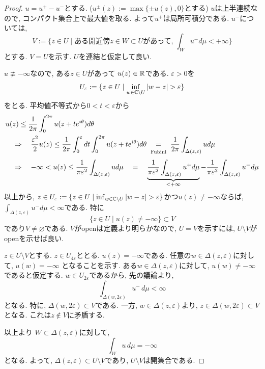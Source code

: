\begin{proof}
$u=u^{+} - u^{-}$とする. 
($u^{\pm}(z):= \max\{ \pm u(z), 0\}$とする)
$u$は上半連続なので, コンパクト集合上で最大値を取る. よって$u^{+}$は局所可積分である.
$u^{-}$については, 
$$
V:= \{ z \in U \mid \text{ある開近傍$z \in W \subset U$があって, 
$\int_{W} u^{-} d \mu < +\infty$} \}
$$
とする. $V=U$を示す. $U$を連結と仮定して良い. 

$u \not \equiv - \infty$なので, ある$z \in U$があって
$u(z) \in \mathbb{R}$である. 
$\varepsilon >0$を
$$
U_\varepsilon := \{ z \in U \mid\inf_{w \in \C \setminus U}|w - z|>\varepsilon \}
$$
をとる. 平均値不等式から$0 < t < \varepsilon$から
\begin{align*}
&u(z) \le \frac{1}{2 \pi}\int_{0}^{2\pi}u(z + t e^{i \theta}) d \theta
\\
&\underalign{\text{}}{\Rightarrow}
\frac{\varepsilon^2}{2}u(z) \le 
\frac{1}{2 \pi}\int_{0}^{\varepsilon } dt\int_{0}^{2\pi}u(z + t e^{i \theta}) d \theta
\underalign{\text{Fubini}}{=}
\frac{1}{2 \pi}\int_{\Delta(z, \varepsilon)} u d \mu
\\
&\underalign{\text{}}{\Rightarrow}
- \infty < u(z) \le 
\frac{1}{\pi \varepsilon^2 }\int_{\Delta(z, \varepsilon)} u d \mu
\underalign{\text{}}{=}
\underbrace{\frac{1}{\pi \varepsilon^2 }\int_{\Delta(z, \varepsilon)} u^{+} d \mu}_{<+\infty}
-
\frac{1}{\pi \varepsilon^2 }\int_{\Delta(z, \varepsilon)} u^{-} d \mu
\end{align*}
以上から, $z \in U_\varepsilon := \{ z \in U \mid\inf_{w \in \C \setminus U}|w - z|>\varepsilon \}$かつ$u(z) \neq - \infty$ならば, $\int_{\Delta(z, \varepsilon)} u^{-} d \mu< \infty$である. 
特に
$$
\{ z \in U \mid u(z) \neq - \infty\}
\subset 
V
$$
であり$V \neq \varnothing$である. 
$V$がopenは定義より明らかなので, $U =V$を示すには, $U \setminus V$がopenを示せば良い. 
 
 
 $z \in U \setminus V$とする. $z \in U_{4 \varepsilon}$ととる.
 $u(z)=-\infty$である. 
 任意の$w \in \Delta(z,\varepsilon)$に対して,
\(
u(w)=-\infty
\)
となることを示す.
ある$w \in \Delta(z,\varepsilon)$に対して,
$u(w) \neq -\infty$であると仮定する.
$w \in U_{2\varepsilon}$であるから, 先の議論より,
\[
\int_{\Delta(w,2\varepsilon)} u^-\,d\mu < \infty
\]
となる.
特に, $\Delta(w,2\varepsilon) \subset V$である.
一方, $w \in \Delta(z,\varepsilon)$より,
\(
z \in \Delta(w,2\varepsilon) \subset V
\)
となる.
これは$z \notin V$に矛盾する.

以上より 
$W \subset \Delta(z,\varepsilon)$に対して,
\[
\int_W u\,d\mu=-\infty
\]
となる.
よって, $\Delta(z,\varepsilon) \subset U \setminus V$であり,
$U \setminus V$は開集合である.


\end{proof}
